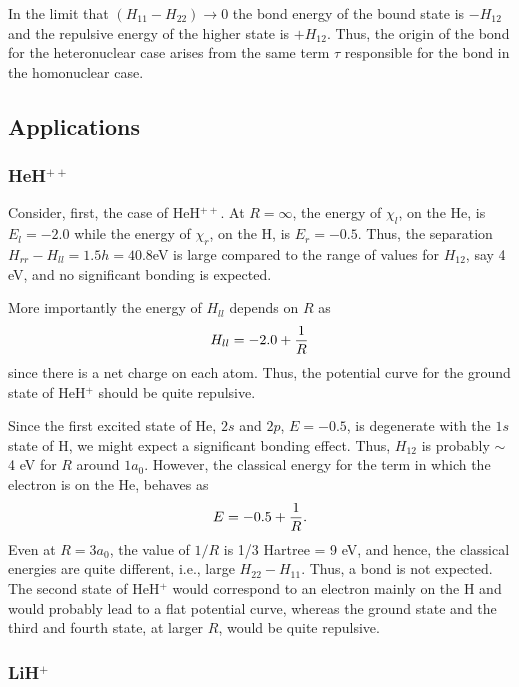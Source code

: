 In the limit that $(H_{11} - H_{22}) \rightarrow 0$ the bond energy of the 
bound state is $-H_{12}$ and the repulsive energy of the higher state 
is $+H_{12}$.  Thus, the
origin of the bond for the heteronuclear case arises from the same 
term $\tau$ responsible for the bond in the homonuclear case.

\subsection{Applications}

\subsubsection{HeH$^{++}$}

Consider, first, the case of HeH$^{++}$.  At $R = \infty$, the energy of 
$\chi_l$, on the He, is $E_l = -2.0$ while the energy of $\chi_r$, on 
the H, is $E_r = -0.5$.  Thus, the separation $H_{rr} - H_{ll} = 1.5h =
40.8$eV is large compared to the range of
values for $H_{12}$, say 4 eV, and no significant bonding is expected.

More importantly the energy of $H_{ll}$ depends on $R$ as
\begin{equation}
H_{ll} = - 2.0 + {1 \over R}
\end{equation}
since there is a net charge on each atom.  Thus, the potential curve for the
ground state of HeH$^+$ should be quite repulsive.

Since the first excited state of He, $2s$ and $2p$, $E = -0.5$, is degenerate
with the $1s$ state of H, we might expect a significant bonding effect. Thus,
$H_{12}$ is probably $\sim$4 eV for $R$ around $1a_0$.  However, the 
classical energy for the term in which the electron is on the He, behaves as
\begin{equation}
E = - 0.5 + {1 \over R} .
\end{equation}
Even at $R = 3a_0$, the value of $1/R$ is 1/3 Hartree = 9 eV, and hence, the
classical energies are quite different, i.e., large $H_{22} - H_{11}$.  Thus, 
a bond is not expected.  The second state of HeH$^+$ would correspond to 
an electron mainly on the H and would probably lead to a flat potential 
curve, whereas the ground state and the third and fourth state, at 
larger $R$, would be quite repulsive.

\subsubsection{LiH$^+$}

